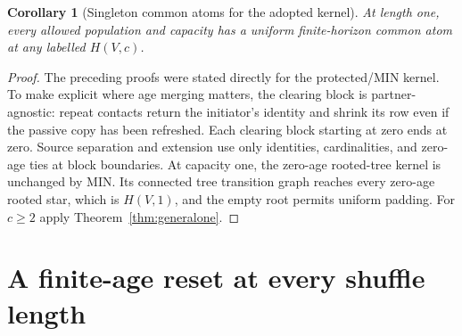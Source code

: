 \documentclass[11pt]{article}
\newtheorem{corollary}[theorem]{Corollary}
\begin{document}
\begin{corollary}[Singleton common atoms for the adopted kernel]
\label{thm:thesisone}
At length one, every allowed population and capacity has a uniform
finite-horizon common atom at any labelled $H(V,c)$.
\end{corollary}
\begin{proof}
The preceding proofs were stated directly for the protected/MIN
kernel. To make explicit where age merging matters, the clearing
block is partner-agnostic: repeat contacts return the initiator's
identity and shrink its row even if the passive copy has been
refreshed. Each clearing block starting at zero ends at zero.
Source separation and extension use only identities, cardinalities,
and zero-age ties at block boundaries. At capacity one, the
zero-age rooted-tree kernel is unchanged by MIN. Its connected tree
transition graph reaches every zero-age rooted star, which is
$H(V,1)$, and the empty root permits uniform padding.
For $c\ge2$ apply Theorem~\ref{thm:generalone}.
\end{proof}

\section{A finite-age reset at every shuffle length}
\end{document}
